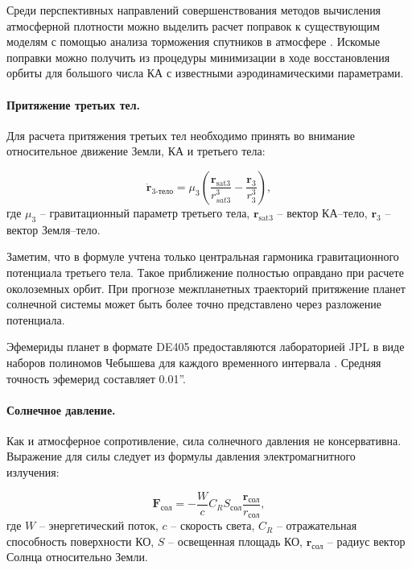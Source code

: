 Среди перспективных направлений совершенствования методов вычисления атмосферной плотности 
можно выделить расчет поправок к существующим моделям с помощью анализа торможения спутников
в атмосфере \cite{cefola2003}. Искомые поправки можно получить из процедуры минимизации в ходе
восстановления орбиты для большого числа КА с известными
аэродинамическими параметрами.

\paragraph{Притяжение третьих тел.}
Для расчета притяжения третьих тел необходимо принять во внимание относительное движение
Земли, КА и третьего тела:

\begin{equation*}
    \ddot{\mathbf{r}}_{\text{3-тело}} = \mu_3 \left( \frac{\mathbf{r}_{\text{sat3}}}{r^3_{sat3}}
                                    - \frac{\mathbf{r}_{\text{3}}}{r^3_{3}} \right),
\end{equation*}
где $\mu_3$ -- гравитационный параметр третьего тела,
 $\mathbf{r}_{\text{sat3}}$ -- вектор КА--тело, 
 $\mathbf{r}_{3}$ -- вектор Земля--тело. 

Заметим, что в формуле учтена только центральная гармоника гравитационного потенциала третьего тела.
Такое приближение полностью оправдано при расчете околоземных орбит.
При прогнозе межпланетных траекторий притяжение планет солнечной системы может быть 
более точно представлено через разложение потенциала.

Эфемериды планет в формате DE405 предоставляются лабораторией JPL в виде наборов полиномов Чебышева для
каждого временного интервала \cite{standish1998}. Средняя точность эфемерид составляет 0.01''.

\paragraph{Солнечное давление.}
Как и атмосферное сопротивление, сила солнечного давления не консервативна. Выражение для силы следует из формулы давления
электромагнитного излучения:

\begin{equation*}
    \mathbf{F}_{\text{сол}} = -\frac{W}{c} C_R S_{\text{сол}} \frac{\mathbf{r}_{\text{сол}}}{r_{\text{сол}}},
\end{equation*}
где $W$ -- энергетический поток, $c$ -- скорость света,
$C_R$ -- отражательная способность поверхности КО,
$S$ -- освещенная площадь КО,
$\mathbf{r}_{\text{сол}}$ -- радиус вектор Солнца относительно Земли.

